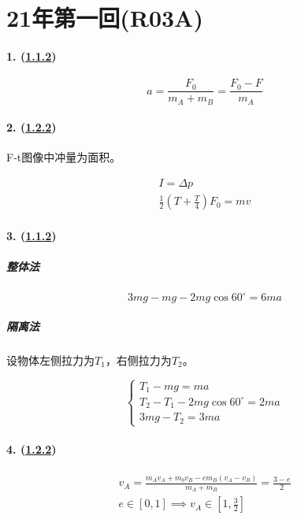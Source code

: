 
\section{21年第一回(R03A)}

\paragraph{1. (\hyperref[subsec:1.1.2]{1.1.2})}

\begin{equation*}
    a=\frac{F_0}{m_A+m_B}=\frac{F_0-F}{m_A}
\end{equation*}

\paragraph{2. (\hyperref[subsec:1.2.2]{1.2.2})} F-t图像中冲量为面积。

\begin{gather*}
    I=\Delta p\\
    \frac12(T+\frac{T}{4})F_0=mv
\end{gather*}

\paragraph{3. (\hyperref[subsec:1.1.2]{1.1.2})}

\subparagraph{整体法}

\begin{equation*}
    3mg-mg-2mg\cos60^\circ=6ma
\end{equation*}

\subparagraph{隔离法} 设物体左侧拉力为$T_1$，右侧拉力为$T_2$。

\begin{equation*}
    \begin{cases}
        T_1-mg=ma\\
        T_2-T_1-2mg\cos60^\circ=2ma\\
        3mg-T_2=3ma
    \end{cases}
\end{equation*}

\paragraph{4. (\hyperref[subsec:1.2.2]{1.2.2})}

\begin{gather*}
    v_A=\frac{m_Av_A+m_bv_B-em_B(v_A-v_B)}{m_A+m_B}=\frac{3-e}{2}\\
    e\in[0,1]\implies v_A\in\left[1,\frac32\right]
\end{gather*}


